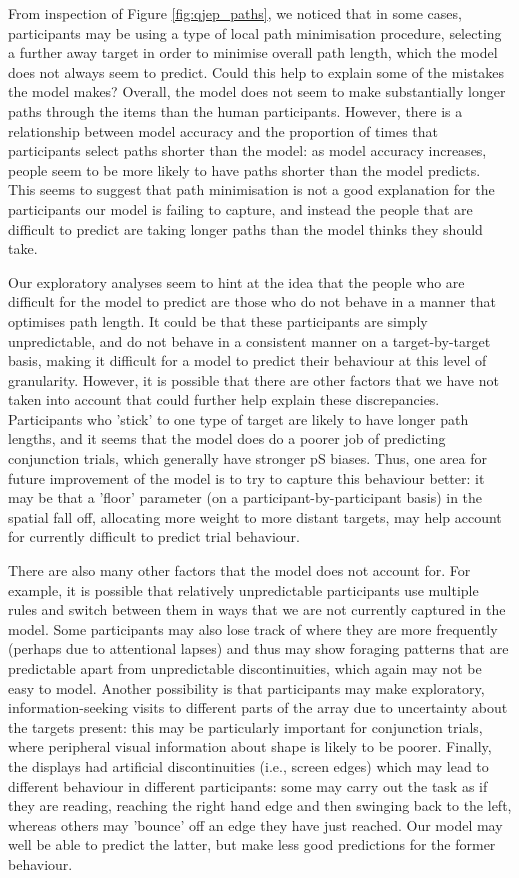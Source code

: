 \documentclass[vision,article,accept,pdftex,moreauthors]{Definitions/mdpi}
\begin{document}
From inspection of Figure \ref{fig:qjep_paths}, we noticed that in some cases, participants may be using a type of local path minimisation procedure, selecting a further away target in order to minimise overall path length, which the model does not always seem to predict. Could this help to explain some of the mistakes the model makes? Overall, the model does not seem to make substantially longer paths through the items than the human participants. However, there is a relationship between model accuracy and the proportion of times that participants select paths shorter than the model: as model accuracy increases, people seem to be more likely to have paths shorter than the model predicts. This seems to suggest that path minimisation is not a good explanation for the participants our model is failing to capture, and instead the people that are difficult to predict are taking longer paths than the model thinks they should take.

Our exploratory analyses seem to hint at the idea that the people who are difficult for the model to predict are those who do not behave in a manner that optimises path length. It could be that these participants are simply unpredictable, and do not behave in a consistent manner on a target-by-target basis, making it difficult for a model to predict their behaviour at this level of granularity. However, it is possible that there are other factors that we have not taken into account that could further help explain these discrepancies. Participants who 'stick' to one type of target are likely to have longer path lengths, and it seems that the model does do a poorer job of predicting conjunction trials, which generally have stronger pS biases. Thus, one area for future improvement of the model is to try to capture this behaviour better: it may be that a 'floor' parameter (on a participant-by-participant basis) in the spatial fall off, allocating more weight to more distant targets, may help account for currently difficult to predict trial behaviour.

There are also many other factors that the model does not account for. For example, it is possible that relatively unpredictable participants use multiple rules and switch between them in ways that we are not currently captured in the model. Some participants may also lose track of where they are more frequently (perhaps due to attentional lapses) and thus may show foraging patterns that are predictable apart from unpredictable discontinuities, which again may not be easy to model. Another possibility is that participants may make exploratory, information-seeking visits to different parts of the array due to uncertainty about the targets present: this may be particularly important for conjunction trials, where peripheral visual information about shape is likely to be poorer. Finally, the displays had artificial discontinuities (i.e., screen edges) which may lead to different behaviour in different participants: some may carry out the task as if they are reading, reaching the right hand edge and then swinging back to the left, whereas others may 'bounce' off an edge they have just reached. Our model may well be able to predict the latter, but make less good predictions for the former behaviour.
\end{document}

